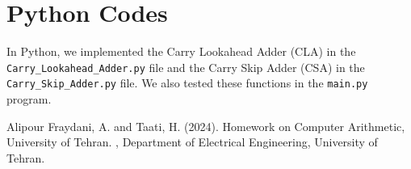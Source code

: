 \documentclass[DIV=calc, paper=a4, fontsize=11pt, twocolumn]{scrartcl}	 %
\begin{document}
\vspace{0.5cm}




\section*{Python Codes}





In Python, we implemented the Carry Lookahead Adder (CLA) in the \texttt{Carry\_Lookahead\_Adder.py} file 
and the Carry Skip Adder (CSA) in the \texttt{Carry\_Skip\_Adder.py} file. We also tested these functions 
in the \texttt{main.py} program.

\begin{thebibliography}{99} %

  Alipour Fraydani, A. and Taati, H. (2024).
  \newblock Homework on Computer Arithmetic, University of Tehran.
  , Department of Electrical Engineering, University of Tehran.
  
  \end{thebibliography}
\end{document}
